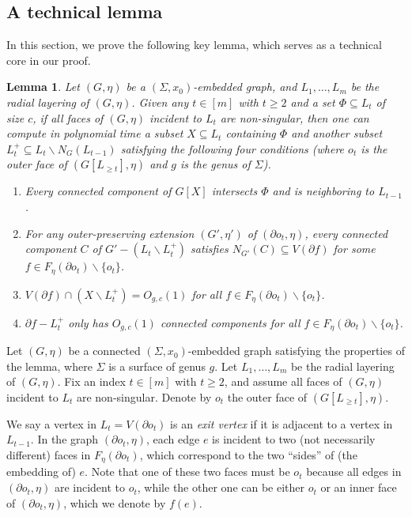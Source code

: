 \documentclass[a4paper,11pt]{article}
\newtheorem{lemma}{Lemma}
\numberwithin{lemma}{section}
\begin{document}
\subsection{A technical lemma}
In this section, we prove the following key lemma, which serves as a technical core in our proof.

\begin{lemma} \label{lem-key}
 Let $(G,\eta)$ be a $(\varSigma,x_0)$-embedded graph, and $L_1,\dots,L_m$ be the radial layering of $(G,\eta)$.
 Given any $t \in [m]$ with $t \geq 2$ and a set $\varPhi \subseteq L_t$ of size $c$, if all faces of $(G,\eta)$ incident to $L_t$ are non-singular, then one can compute in polynomial time a subset $X \subseteq L_t$ containing $\varPhi$ and another subset $L_t^+ \subseteq L_t \backslash N_G(L_{t-1})$ satisfying the following four conditions (where $o_t$ is the outer face of $(G[L_{\geq t}],\eta)$ and $g$ is the genus of $\varSigma$).
 \begin{enumerate}[label = (\arabic*)]
  \item\label{item:rcd-key-1} Every connected component of $G[X]$ intersects $\varPhi$ and is neighboring to $L_{t-1}$.
  \item\label{item:rcd-key-2} For any outer-preserving extension $(G',\eta')$ of $(\partial o_t,\eta)$, every connected component $C$ of $G'-(L_t \backslash L_t^+)$ satisfies $N_{G'}(C) \subseteq V(\partial f)$ for some $f \in F_\eta(\partial o_t) \backslash \{o_t\}$.
  \item\label{item:rcd-key-3} $V(\partial f) \cap (X \backslash L_t^+) = O_{g,c}(1)$ for all $f \in F_\eta(\partial o_t) \backslash \{o_t\}$.
  \item\label{item:rcd-key-4} $\partial f - L_t^+$ only has $O_{g,c}(1)$ connected components for all $f \in F_\eta(\partial o_t) \backslash \{o_t\}$.
 \end{enumerate}
\end{lemma}

Let $(G,\eta)$ be a connected $(\varSigma,x_0)$-embedded graph satisfying the properties of the lemma, where $\varSigma$ is a surface of genus $g$.
Let $L_1,\dots,L_m$ be the radial layering of $(G,\eta)$.
Fix an index $t \in [m]$ with $t \geq 2$, and assume all faces of $(G,\eta)$ incident to $L_t$ are non-singular.
Denote by $o_t$ the outer face of $(G[L_{\geq t}],\eta)$.

We say a vertex in $L_t = V(\partial o_t)$ is an \textit{exit vertex} if it is adjacent to a vertex in $L_{t-1}$.
In the graph $(\partial o_t,\eta)$, each edge $e$ is incident to two (not necessarily different) faces in $F_\eta(\partial o_t)$, which correspond to the two ``sides'' of (the embedding of) $e$.
Note that one of these two faces must be $o_t$ because all edges in $(\partial o_t,\eta)$ are incident to $o_t$, while the other one can be either $o_t$ or an inner face of $(\partial o_t,\eta)$, which we denote by $f(e)$.
\end{document}
